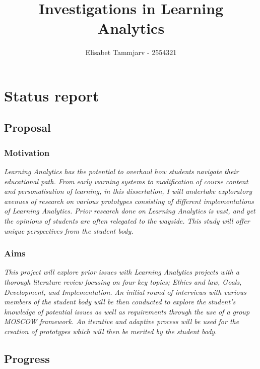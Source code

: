 \documentclass[11pt]{article}
\title{Investigations in Learning Analytics}
\author{Elisabet Tammjarv - 2554321}
\begin{document}
    \maketitle
    
    
     

\section{Status report}

\subsection{Proposal}\label{proposal}

\subsubsection{Motivation}\label{motivation}

\emph{{Learning Analytics has the potential to overhaul how students navigate their educational path. From early warning systems to modification of course content and personalisation of learning, in this dissertation, I will undertake exploratory avenues of research on various prototypes consisting of different implementations of Learning Analytics. Prior research done on Learning Analytics is vast, and yet the opinions of students are often relegated to the wayside. This study will offer unique perspectives from the student body. }}

\subsubsection{Aims}\label{aims}

\emph{{This project will explore prior issues with Learning Analytics projects with a thorough literature review focusing on four key topics; Ethics and law, Goals, Development, and Implementation. An initial round of interviews with various members of the student body will be then conducted to explore the student's knowledge of potential issues as well as requirements through the use of a group MOSCOW framework. An iterative and adaptive process will be used for the creation of prototypes which will then be merited by the student body. }}

\subsection{Progress}\label{progress}
\end{document}
